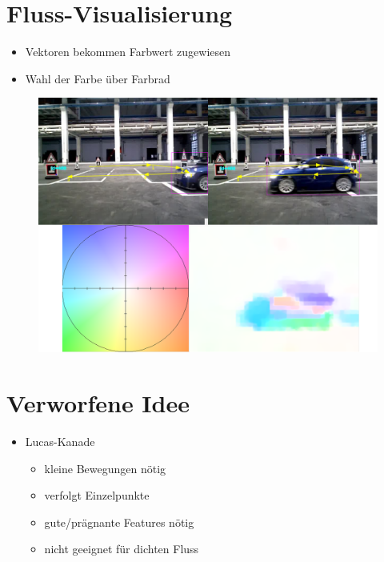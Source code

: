 \documentclass[10pt]{beamer}
\begin{document}
\section{Fluss-Visualisierung}
\begin{frame}{\secname}

	\begin{itemize}
		\item Vektoren bekommen Farbwert zugewiesen
		\item Wahl der Farbe über Farbrad
	\end{itemize}

		
	\begin{figure}[h]
	\centering
	\includegraphics[scale=0.2]{./Abbildungen/7.png}
	\label{img:bsp4}
	\end{figure}

\end{frame}

\section{Verworfene Idee}
\begin{frame}{\secname}
	
	\begin{itemize}
		\item Lucas-Kanade
		\begin{itemize}
			\item kleine Bewegungen nötig
			\item verfolgt Einzelpunkte
			\item gute/prägnante Features nötig
			\item nicht geeignet für dichten Fluss
		\end{itemize}
	\end{itemize}
	
\end{frame}
\end{document}
